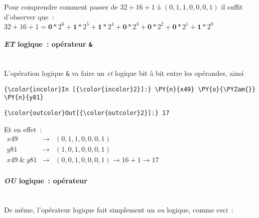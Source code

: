     Pour comprendre comment passer de \(32 + 16 + 1\) à \((0,1,1,0,0,0,1)\)
il suffit d'observer que~:\\

\(32 + 16 + 1 = \textbf{0}*2^6 + \textbf{1}*2^5 + \textbf{1}*2^4 + \textbf{0}*2^3 + \textbf{0}*2^2 + \textbf{0}*2^1 + \textbf{1}*2^0\)

    \hypertarget{et-logique-opuxe9rateur}{%
\paragraph{\texorpdfstring{\emph{ET} logique~: opérateur
\texttt{\&}}{ET logique~: opérateur \&}\\\\}\label{et-logique-opuxe9rateur}}

    L'opération logique \texttt{\&} va faire un \emph{et} logique bit à bit
entre les opérandes, ainsi

    \begin{Verbatim}[commandchars=\\\{\}]
{\color{incolor}In [{\color{incolor}2}]:} \PY{n}{x49} \PY{o}{\PYZam{}} \PY{n}{y81}
\end{Verbatim}


\begin{Verbatim}[commandchars=\\\{\}]
{\color{outcolor}Out[{\color{outcolor}2}]:} 17
\end{Verbatim}
            
    Et en effet~:\\

\(\begin{array}{rcl} x49 & \rightarrow & (0,1,1,0,0,0,1) \\ y81 & \rightarrow & (1,0,1,0,0,0,1) \\ x49\ \&\ y81 & \rightarrow & (0,0,1,0,0,0,1) \rightarrow 16 + 1 \rightarrow 17 \end{array}\)

    \hypertarget{ou-logique-opuxe9rateur}{%
\paragraph{\texorpdfstring{\emph{OU} logique~: opérateur
\texttt{\textbar{}}}{OU logique~: opérateur \textbar{}}\\\\}\label{ou-logique-opuxe9rateur}}

    De même, l'opérateur logique \texttt{\textbar{}} fait simplement un
\emph{ou} logique, comme ceci~:

